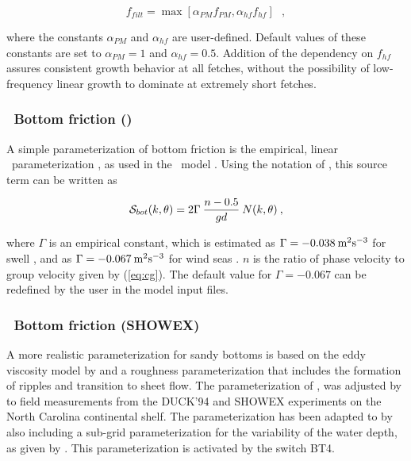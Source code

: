 \begin{equation}
f_{filt} = \max \left [ \alpha_{PM} f_{PM} , \alpha_{hf} f_{hf} \right ]
\:\:\: ,
\end{equation}

\noindent
where the constants $\alpha_{PM}$ and $\alpha_{hf}$ are user-defined. Default
values of these constants are set to $\alpha_{PM} = 1$ and $\alpha_{hf} =
0.5$.  Addition of the dependency on $f_{hf}$ assures consistent growth
behavior at all fetches, without the possibility of low-frequency linear
growth to dominate at extremely short fetches.


\vsssub
\subsubsection{~Bottom friction (\js)} \label{sec:jonswap}
\vsssub

A simple parameterization of bottom friction is the empirical, linear \js\
parameterization \citep{art:JONSWAP}, as used in the \wam\ model
\citep{art:WAM88}. Using the notation of \cite{tol:JPO91b}, this source term
can be written as


\begin{equation}
{\cal S}_{bot}(k,\theta) = 2 \Gamma \: \frac{n-0.5}{gd} \: N(k,\theta)
\: , \label{eq:JONSWAP_bot}
\end{equation}

\noindent
where $\Gamma$ is an empirical constant, which is estimated as $\Gamma =
-0.038\:\mbox m^2 \mbox s ^{-3}$ for swell \citep{art:JONSWAP}, and as $\Gamma
= -0.067\:\mbox m^2 \mbox s^{-3}$ for wind seas \citep{art:BK83}. $n$ is the
ratio of phase velocity to group velocity given by (\ref{eq:cg}). The default
value for $\Gamma = -0.067$ can be redefined by the user in the model input
files.

\vsssub
\subsubsection{~Bottom friction (SHOWEX)} \label{sec:showex}
\vsssub

A more realistic parameterization for sandy bottoms is based on the eddy viscosity model 
by \cite{art:GM79} and a roughness parameterization that includes the formation of ripples 
and transition to sheet flow. The parameterization of \cite{tol:JPO94}, was adjusted by 
\cite{art:AHJR03} to field measurements from the DUCK'94 and SHOWEX experiments on the 
North Carolina continental shelf. The parameterization has been adapted to \ws by also 
including a sub-grid parameterization for the variability of the water depth, 
as given by  \cite{tol:CE95}. This parameterization is activated by the switch BT4. 

